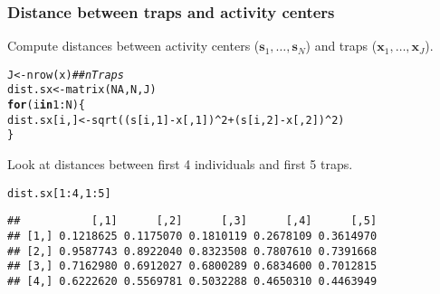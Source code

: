 \documentclass[color=usenames,dvipsnames]{beamer}\usepackage[]{graphicx}\usepackage[]{color}
\makeatletter
\newcommand{\hlnum}[1]{\textcolor[rgb]{0.69,0.494,0}{#1}}%
\newcommand{\hlcom}[1]{\textcolor[rgb]{0.514,0.506,0.514}{\textit{#1}}}%
\newcommand{\hlopt}[1]{\textcolor[rgb]{0,0,0}{#1}}%
\newcommand{\hlstd}[1]{\textcolor[rgb]{0,0,0}{#1}}%
\newcommand{\hlkwa}[1]{\textcolor[rgb]{0,0,0}{\textbf{#1}}}%
\newcommand{\hlkwb}[1]{\textcolor[rgb]{0,0.341,0.682}{#1}}%
\newcommand{\hlkwd}[1]{\textcolor[rgb]{0.004,0.004,0.506}{#1}}%
\newenvironment{kframe}{%
 \def\at@end@of@kframe{}%
 \ifinner\ifhmode%
  \def\at@end@of@kframe{\end{minipage}}%
  \begin{minipage}{\columnwidth}%
 \fi\fi%
 \def\FrameCommand##1{\hskip\@totalleftmargin \hskip-\fboxsep
 \colorbox{shadecolor}{##1}\hskip-\fboxsep
     \hskip-\linewidth \hskip-\@totalleftmargin \hskip\columnwidth}%
 \MakeFramed {\advance\hsize-\width
   \@totalleftmargin\z@ \linewidth\hsize
   \@setminipage}}%
 {\par\unskip\endMakeFramed%
 \at@end@of@kframe}
\newenvironment{knitrout}{}{} %
\newcommand{\bx}{{\bm x}}
\newcommand{\bs}{{\bm s}}
\makeatother
\begin{document}
\begin{frame}[fragile]
  \frametitle{Distance between traps and activity centers}
  Compute distances between activity centers ($\bs_1, \dots, \bs_N$)
  and traps ($\bx_1, \dots, \bx_J$).
\begin{knitrout}\footnotesize
{}\color{fgcolor}\begin{kframe}
\begin{alltt}
\hlstd{J} \hlkwb{<-} \hlkwd{nrow}\hlstd{(x)}                 \hlcom{## nTraps}
\hlstd{dist.sx} \hlkwb{<-} \hlkwd{matrix}\hlstd{(}\hlnum{NA}\hlstd{, N, J)}
\hlkwa{for}\hlstd{(i} \hlkwa{in} \hlnum{1}\hlopt{:}\hlstd{N) \{}
    \hlstd{dist.sx[i,]} \hlkwb{<-} \hlkwd{sqrt}\hlstd{((s[i,}\hlnum{1}\hlstd{]}\hlopt{-}\hlstd{x[,}\hlnum{1}\hlstd{])}\hlopt{^}\hlnum{2} \hlopt{+} \hlstd{(s[i,}\hlnum{2}\hlstd{]}\hlopt{-}\hlstd{x[,}\hlnum{2}\hlstd{])}\hlopt{^}\hlnum{2}\hlstd{)}
\hlstd{\}}
\end{alltt}
\end{kframe}
\end{knitrout}
\pause
\vfill
  Look at distances between first 4 individuals and first 5 traps.
\begin{knitrout}\footnotesize
{}\color{fgcolor}\begin{kframe}
\begin{alltt}
\hlstd{dist.sx[}\hlnum{1}\hlopt{:}\hlnum{4}\hlstd{,}\hlnum{1}\hlopt{:}\hlnum{5}\hlstd{]}
\end{alltt}
\begin{verbatim}
##           [,1]      [,2]      [,3]      [,4]      [,5]
## [1,] 0.1218625 0.1175070 0.1810119 0.2678109 0.3614970
## [2,] 0.9587743 0.8922040 0.8323508 0.7807610 0.7391668
## [3,] 0.7162980 0.6912027 0.6800289 0.6834600 0.7012815
## [4,] 0.6222620 0.5569781 0.5032288 0.4650310 0.4463949
\end{verbatim}
\end{kframe}
\end{knitrout}

\end{frame}
\end{document}
